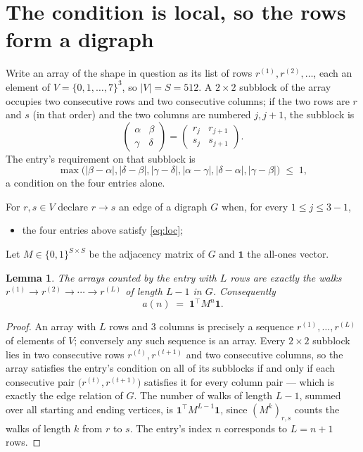 \documentclass[11pt,a4paper]{article}
\theoremstyle{plain}
\newtheorem{lemma}[theorem]{Lemma}
\theoremstyle{definition}
\begin{document}
\section{The condition is local, so the rows form a digraph}

Write an array of the shape in question as its list of rows
$r^{(1)},r^{(2)},\dots$, each an element of
$V=\{0,1,\dots,7\}^{3}$, so $|V|=S=512$. A $2\times2$ subblock of the array
occupies two consecutive rows and two consecutive columns; if the two rows are $r$
and $s$ (in that order) and the two columns are numbered $j,j+1$,
the subblock is
\[
\begin{pmatrix}\alpha&\beta\\\gamma&\delta\end{pmatrix}=\begin{pmatrix}r_j&r_{j+1}\\s_j&s_{j+1}\end{pmatrix}.
\]
The entry's requirement on that subblock is
\begin{equation}\label{eq:loc}
\max\bigl(|\beta-\alpha|,|\delta-\beta|,|\gamma-\delta|,|\alpha-\gamma|,|\delta-\alpha|,|\gamma-\beta|\bigr)\;\le\;1,
\end{equation}
a condition on the four entries alone.

For $r,s\in V$ declare $r\to s$ an edge of a digraph $G$ when, for every
$1\le j\le 3-1$,
\begin{itemize}
\item the four entries above satisfy \eqref{eq:loc};

\end{itemize}
Let $M\in\{0,1\}^{S\times S}$ be the adjacency matrix of $G$ and $\mathbf{1}$ the
all-ones vector.

\begin{lemma}\label{lem:walk}
The arrays counted by the entry with $L$ rows are exactly the walks
$r^{(1)}\to r^{(2)}\to\cdots\to r^{(L)}$ of length $L-1$ in $G$. Consequently
\[
a(n)\;=\;\mathbf{1}^{\!\top}M^{n}\mathbf{1} .
\]
\end{lemma}

\begin{proof}
An array with $L$ rows and $3$ columns is precisely a sequence
$r^{(1)},\dots,r^{(L)}$ of elements of $V$; conversely any such sequence is an array.
Every $2\times2$ subblock lies in two consecutive rows $r^{(t)},r^{(t+1)}$ and two
consecutive columns, so the array satisfies the entry's condition on all of its subblocks
if and only if each consecutive pair $\bigl(r^{(t)},r^{(t+1)}\bigr)$ satisfies it for
every column pair --- which is exactly the edge relation of $G$. The number of walks of
length $L-1$, summed over all starting and ending vertices, is
$\mathbf{1}^{\!\top}M^{L-1}\mathbf{1}$, since $(M^{k})_{r,s}$ counts the walks of
length $k$ from $r$ to $s$. The entry's index $n$ corresponds to $L=n+1$ rows.
\end{proof}
\end{document}
